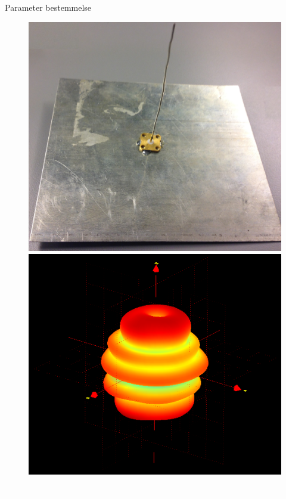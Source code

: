 \begin{frame}{Parameter bestemmelse}
\begin{minipage}{0.45\textwidth}
\begin{figure}[!htbp]
	\centering
	\includegraphics[width = 0.87\columnwidth]{figures/MonoAnt.jpg}\\
	\includegraphics[width = 0.87\columnwidth]{figures/MonoStor2500.png}
\end{figure}
\end{minipage}%
\begin{minipage}{0.1\textwidth}
\textcolor{white}{.} 
\end{minipage}%
\begin{minipage}{0.45\textwidth}

\end{minipage}
\end{frame}
